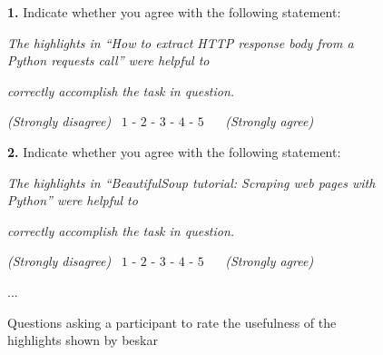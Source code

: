 \begin{figure}
\begin{mdframed}[backgroundcolor=gray!15] 
\begin{scriptsize}

\noindent \textbf{1.} Indicate whether you agree with the following statement:

\medskip

\quad \textit{The highlights in ``How to extract HTTP response body from a Python requests call'' were helpful to} 

\quad \textit{correctly accomplish the task in question.}  \smallskip

\smallskip

\quad \quad \textit{(Strongly disagree)} ~$1$ - $2$ - $3$ - $4$ - $5$ ~ ~\textit{(Strongly agree)} 


\bigskip


\noindent \textbf{2.} Indicate whether you agree with the following statement:

\medskip

\quad \textit{The highlights in ``BeautifulSoup tutorial: Scraping web pages with Python'' were helpful to} 

\quad \textit{correctly accomplish the task in question.}  \smallskip

\smallskip

\quad \quad \textit{(Strongly disagree)} ~$1$ - $2$ - $3$ - $4$ - $5$ ~ ~\textit{(Strongly agree)} 

\centering 

...

\end{scriptsize}
\end{mdframed}
\caption{Questions asking a participant to rate the usefulness of the highlights shown by \acs{beskar}}
\label{fig:experiment-rating}
\end{figure}

    
